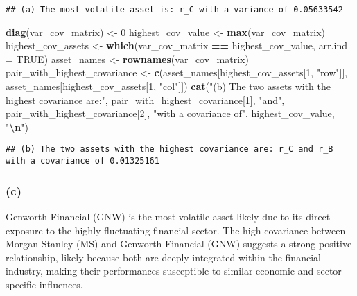 \documentclass[
]{article}
\newenvironment{Shaded}{\begin{snugshade}}{\end{snugshade}}
\newcommand{\AttributeTok}[1]{\textcolor[rgb]{0.13,0.29,0.53}{#1}}
\newcommand{\ConstantTok}[1]{\textcolor[rgb]{0.56,0.35,0.01}{#1}}
\newcommand{\DecValTok}[1]{\textcolor[rgb]{0.00,0.00,0.81}{#1}}
\newcommand{\FunctionTok}[1]{\textcolor[rgb]{0.13,0.29,0.53}{\textbf{#1}}}
\newcommand{\NormalTok}[1]{#1}
\newcommand{\OtherTok}[1]{\textcolor[rgb]{0.56,0.35,0.01}{#1}}
\newcommand{\SpecialCharTok}[1]{\textcolor[rgb]{0.81,0.36,0.00}{\textbf{#1}}}
\newcommand{\StringTok}[1]{\textcolor[rgb]{0.31,0.60,0.02}{#1}}
\begin{document}
\begin{verbatim}
## (a) The most volatile asset is: r_C with a variance of 0.05633542
\end{verbatim}

\begin{Shaded}
\begin{Highlighting}[]
\FunctionTok{diag}\NormalTok{(var\_cov\_matrix) }\OtherTok{\textless{}{-}} \DecValTok{0}
\NormalTok{highest\_cov\_value }\OtherTok{\textless{}{-}} \FunctionTok{max}\NormalTok{(var\_cov\_matrix)}
\NormalTok{highest\_cov\_assets }\OtherTok{\textless{}{-}} \FunctionTok{which}\NormalTok{(var\_cov\_matrix }\SpecialCharTok{==}\NormalTok{ highest\_cov\_value, }\AttributeTok{arr.ind =} \ConstantTok{TRUE}\NormalTok{)}
\NormalTok{asset\_names }\OtherTok{\textless{}{-}} \FunctionTok{rownames}\NormalTok{(var\_cov\_matrix)}
\NormalTok{pair\_with\_highest\_covariance }\OtherTok{\textless{}{-}} \FunctionTok{c}\NormalTok{(asset\_names[highest\_cov\_assets[}\DecValTok{1}\NormalTok{, }\StringTok{"row"}\NormalTok{]], asset\_names[highest\_cov\_assets[}\DecValTok{1}\NormalTok{, }\StringTok{"col"}\NormalTok{]])}
\FunctionTok{cat}\NormalTok{(}\StringTok{"(b) The two assets with the highest covariance are:"}\NormalTok{, pair\_with\_highest\_covariance[}\DecValTok{1}\NormalTok{], }\StringTok{"and"}\NormalTok{, pair\_with\_highest\_covariance[}\DecValTok{2}\NormalTok{], }\StringTok{"with a covariance of"}\NormalTok{, highest\_cov\_value, }\StringTok{"}\SpecialCharTok{\textbackslash{}n}\StringTok{"}\NormalTok{)}
\end{Highlighting}
\end{Shaded}

\begin{verbatim}
## (b) The two assets with the highest covariance are: r_C and r_B with a covariance of 0.01325161
\end{verbatim}

\hypertarget{c}{%
\subsubsection{(c)}\label{c}}

Genworth Financial (GNW) is the most volatile asset likely due to its
direct exposure to the highly fluctuating financial sector. The high
covariance between Morgan Stanley (MS) and Genworth Financial (GNW)
suggests a strong positive relationship, likely because both are deeply
integrated within the financial industry, making their performances
susceptible to similar economic and sector-specific influences.
\end{document}
